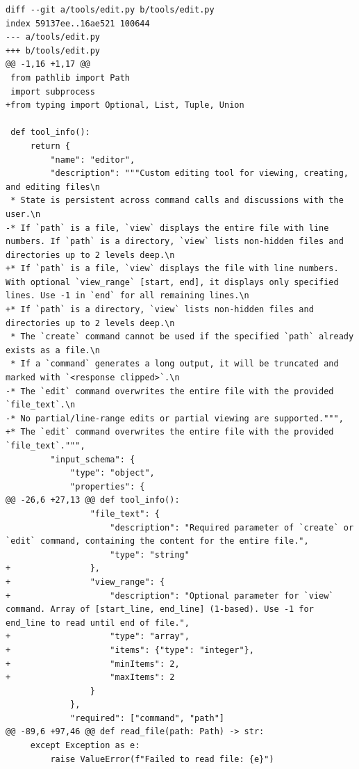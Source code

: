 \documentclass{article}
\begin{document}
\begin{lstlisting}[style=diffstyle]
diff --git a/tools/edit.py b/tools/edit.py
index 59137ee..16ae521 100644
--- a/tools/edit.py
+++ b/tools/edit.py
@@ -1,16 +1,17 @@
 from pathlib import Path
 import subprocess
+from typing import Optional, List, Tuple, Union
 
 def tool_info():
     return {
         "name": "editor",
         "description": """Custom editing tool for viewing, creating, and editing files\n
 * State is persistent across command calls and discussions with the user.\n
-* If `path` is a file, `view` displays the entire file with line numbers. If `path` is a directory, `view` lists non-hidden files and directories up to 2 levels deep.\n
+* If `path` is a file, `view` displays the file with line numbers. With optional `view_range` [start, end], it displays only specified lines. Use -1 in `end` for all remaining lines.\n
+* If `path` is a directory, `view` lists non-hidden files and directories up to 2 levels deep.\n
 * The `create` command cannot be used if the specified `path` already exists as a file.\n
 * If a `command` generates a long output, it will be truncated and marked with `<response clipped>`.\n
-* The `edit` command overwrites the entire file with the provided `file_text`.\n
-* No partial/line-range edits or partial viewing are supported.""",
+* The `edit` command overwrites the entire file with the provided `file_text`.""",
         "input_schema": {
             "type": "object",
             "properties": {
@@ -26,6 +27,13 @@ def tool_info():
                 "file_text": {
                     "description": "Required parameter of `create` or `edit` command, containing the content for the entire file.",
                     "type": "string"
+                },
+                "view_range": {
+                    "description": "Optional parameter for `view` command. Array of [start_line, end_line] (1-based). Use -1 for end_line to read until end of file.",
+                    "type": "array",
+                    "items": {"type": "integer"},
+                    "minItems": 2,
+                    "maxItems": 2
                 }
             },
             "required": ["command", "path"]
@@ -89,6 +97,46 @@ def read_file(path: Path) -> str:
     except Exception as e:
         raise ValueError(f"Failed to read file: {e}")
 

\end{lstlisting}
\end{document}
